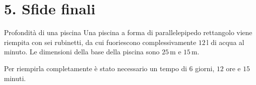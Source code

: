 \condnewpage

\section*{5. Sfide finali}

\begin{esercizio}{Profondità di una piscina}
Una piscina a forma di parallelepipedo rettangolo viene riempita con sei rubinetti, da cui fuoriescono complessivamente $12\,\mathrm{l}$ di acqua al minuto. Le dimensioni della base della piscina sono $25\,\mathrm{m}$ e $15\,\mathrm{m}$.

Per riempirla completamente è stato necessario un tempo di $6$ giorni, $12$ ore e $15$ minuti.


\responsespace{8cm}


\end{esercizio}
